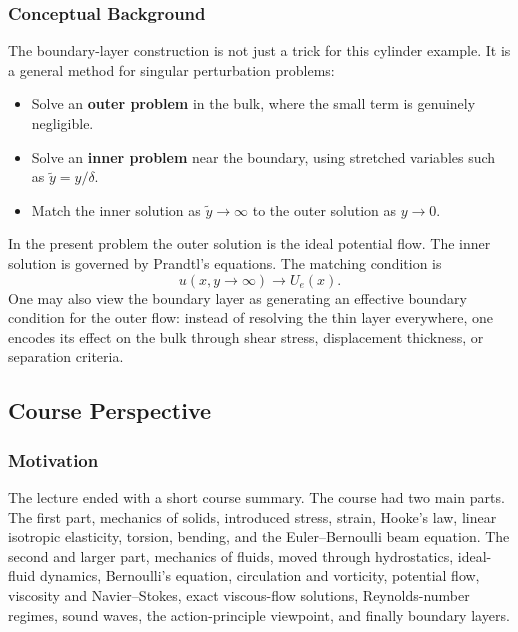 \documentclass[../main.tex]{subfiles}
\begin{document}
\subsubsection*{Conceptual Background}
The boundary-layer construction is not just a trick for this cylinder example.
It is a general method for singular perturbation problems:
\begin{itemize}
  \item Solve an \textbf{outer problem} in the bulk, where the small term is
  genuinely negligible.
  \item Solve an \textbf{inner problem} near the boundary, using stretched
  variables such as $\tilde y=y/\delta$.
  \item Match the inner solution as $\tilde y\to\infty$ to the outer solution as
  $y\to0$.
\end{itemize}

In the present problem the outer solution is the ideal potential flow.  The
inner solution is governed by Prandtl's equations.  The matching condition is
\[
  u(x,y\to\infty)\to U_e(x).
\]
One may also view the boundary layer as generating an effective boundary
condition for the outer flow: instead of resolving the thin layer everywhere,
one encodes its effect on the bulk through shear stress, displacement
thickness, or separation criteria.


\subsection{Course Perspective}\label{sec:lec24:course-perspective}

\subsubsection*{Motivation}
The lecture ended with a short course summary.  The course had two main parts.
The first part, mechanics of solids, introduced stress, strain, Hooke's law,
linear isotropic elasticity, torsion, bending, and the Euler--Bernoulli beam
equation.  The second and larger part, mechanics of fluids, moved through
hydrostatics, ideal-fluid dynamics, Bernoulli's equation, circulation and
vorticity, potential flow, viscosity and Navier--Stokes, exact viscous-flow
solutions, Reynolds-number regimes, sound waves, the action-principle
viewpoint, and finally boundary layers.
\end{document}
